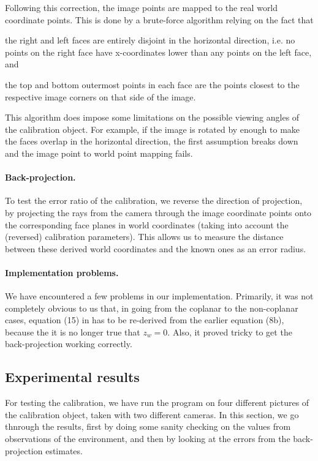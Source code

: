 Following this correction, the image points are mapped to the real
world coordinate points. This is done by a brute-force algorithm
relying on the fact that
\begin{inparaenum}[(a)]
  \item the right and left faces are entirely disjoint in the
    horizontal direction, i.e. no points on the right face have
    x-coordinates lower than any points on the left face, and
  \item the top and bottom outermost points in each face are the
    points closest to the respective image corners on that side of the
    image.
\end{inparaenum}
This algorithm does impose some limitations on the possible viewing
angles of the calibration object. For example, if the image is rotated
by enough to make the faces overlap in the horizontal direction, the
first assumption breaks down and the image point to world point
mapping fails.

\paragraph{Back-projection.}
To test the error ratio of the calibration, we reverse the direction
of projection, by projecting the rays from the camera through the
image coordinate points onto the corresponding face planes in world
coordinates (taking into account the (reversed) calibration
parameters). This allows us to measure the distance between these
derived world coordinates and the known ones as an error radius.

\paragraph{Implementation problems.}
We have encountered a few problems in our implementation. Primarily,
it was not completely obvious to us that, in going from the coplanar
to the non-coplanar cases, equation (15) in \cite{TSAI} has to be
re-derived from the earlier equation (8b), because the it is no longer
true that $z_w=0$. Also, it proved tricky to get the back-projection
working correctly.

\subsection{Experimental results}
For testing the calibration, we have run the program on four different
pictures of the calibration object, taken with two different cameras.
In this section, we go thnrough the results, first by doing some sanity
checking on the values from observations of the environment, and then
by looking at the errors from the back-projection estimates.

